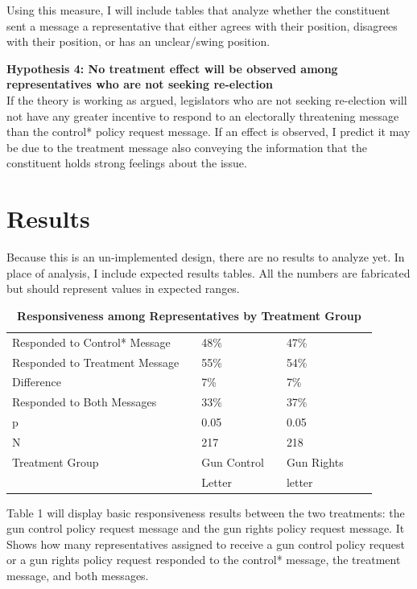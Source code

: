 \documentclass[12pt]{article}
\begin{document}
Using this measure, I will include tables that analyze whether the constituent sent a message a representative that either agrees with their position, disagrees with their position, or has an unclear/swing position.


\textbf{Hypothesis 4: No treatment effect will be observed among representatives who are not seeking re-election}\\
If the theory is working as argued, legislators who are not seeking re-election will not have any greater incentive to respond to an electorally threatening message than the control* policy request message. If an effect is observed, I predict it may be due to the treatment message also conveying the information that the constituent holds strong feelings about the issue.

\section{Results}
Because this is an un-implemented design, there are no results to analyze yet. In place of analysis, I include expected results tables. All the numbers are fabricated but should represent values in expected ranges.
 \begin{table}[h!]
	\caption{\textbf{Responsiveness among Representatives by Treatment Group}}
	\label{tab2}
	\begin{tabular}{lllllll}
		Responded to Control* Message   && 48\%            &&   47\%\\
		Responded to Treatment Message && 55\%          &&   54\%\\ 
		Difference && 7\%            &&   7\%\\ 
		Responded to Both Messages && 33\% &&   37\%\\
		\hline
		p            && 0.05 				&&   0.05 \\
		N 			 &&      217 			 &&  218    \\
		\hline
		Treatment Group && Gun Control  && Gun Rights & \\
						&&	Letter		&& letter
	\end{tabular}
\end{table}

Table 1 will display basic responsiveness results between the two treatments: the gun control policy request message and the gun rights policy request message. It Shows how many representatives assigned to receive a gun control policy request or a gun rights policy request responded to the control* message, the treatment message, and both messages.
\end{document}
